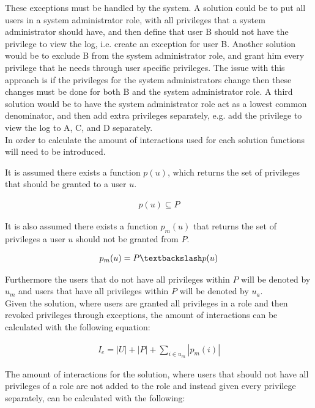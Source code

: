 These exceptions must be handled by the system.
A solution could be to put all users in a system administrator role, with all privileges that a system administrator should have, and then define that user B should not have the privilege to view the log, i.e. create an exception for user B.
Another solution would be to exclude B from the system administrator role, and grant him every privilege that he needs through user specific privileges.
The issue with this approach is if the privileges for the system administrators change then these changes must be done for both B and the system administrator role.
A third solution would be to have the system administrator role act as a lowest common denominator, and then add extra privileges separately, e.g. add the privilege to view the log to A, C, and D separately. \\

In order to calculate the amount of interactions used for each solution functions will need to be introduced.

It is assumed there exists a function $p(u)$, which returns the set of privileges that should be granted to a user $u$.

\begin{align}
p(u) \subseteq P
\end{align}

It is also assumed there exists a function $p_{m}(u)$ that returns the set of privileges a user $u$ should not be granted from $P$.

\begin{align}
p_{m}(u)=P\textbackslash p(u)
\end{align}

Furthermore the users that do not have all privileges within $P$ will be denoted by $u_{m}$ and users that have all privileges within $P$ will be denoted by $u_{a}$. \\

Given the solution, where users are granted all privileges in a role and then revoked privileges through exceptions, the amount of interactions can be calculated with the following equation:

\begin{align}
I_{e} = |U| + |P| + \sum_{i \in u_{m}} |p_{m}(i)|
\end{align}

The amount of interactions for the solution, where users that should not have all privileges of a role are not added to the role and instead given every privilege separately, can be calculated with the following:

